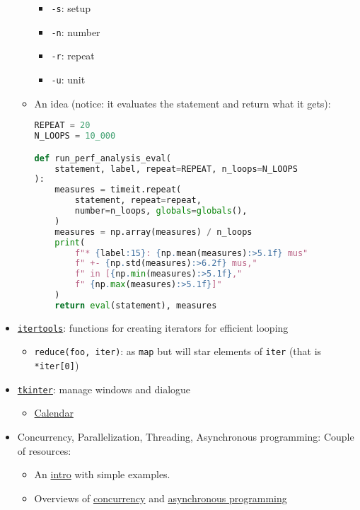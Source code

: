 \documentclass[a4paper,12pt,%
              final%
              ]{article}
\begin{document}
\begin{itemize}
\begin{itemize}
        \begin{itemize}
          \item \verb|-s|: setup
          \item \verb|-n|: number
          \item \verb|-r|: repeat
          \item \verb|-u|: unit
        \end{itemize}
      \item An idea (notice: it evaluates the statement and return what it gets):
\begin{lstlisting}[language=python]
REPEAT = 20
N_LOOPS = 10_000

def run_perf_analysis_eval(
    statement, label, repeat=REPEAT, n_loops=N_LOOPS
):
    measures = timeit.repeat(
        statement, repeat=repeat,
        number=n_loops, globals=globals(),
    )
    measures = np.array(measures) / n_loops
    print(
        f"* {label:15}: {np.mean(measures):>5.1f} mus"
        f" +- {np.std(measures):>6.2f} mus,"
        f" in [{np.min(measures):>5.1f},"
        f" {np.max(measures):>5.1f}]"
    )
    return eval(statement), measures
\end{lstlisting}
    \end{itemize}
  \item \href{https://docs.python.org/3/library/itertools.html}{\texttt{itertools}}: functions for creating iterators for efficient looping
    \begin{itemize}
      \item \verb|reduce(foo, iter)|: as \texttt{map} but will star elements of \texttt{iter} (that is \verb|*iter[0]|)
    \end{itemize}
  \item \href{https://docs.python.org/3/library/tkinter.html}{\texttt{tkinter}}: manage windows and dialogue
    \begin{itemize}
      \item \href{https://tkcalendar.readthedocs.io/en/stable/index.html}{Calendar}
    \end{itemize}
  \item Concurrency, Parallelization, Threading, Asynchronous programming: Couple of resources:
    \begin{itemize}
      \item An \href{https://www.machinelearningplus.com/python/parallel-processing-python/}{intro} with simple examples.
      \item Overviews of \href{https://realpython.com/python-concurrency/}{concurrency} and \href{https://realpython.com/async-io-python/}{asynchronous programming}

\end{itemize}
\end{itemize}
\end{document}
